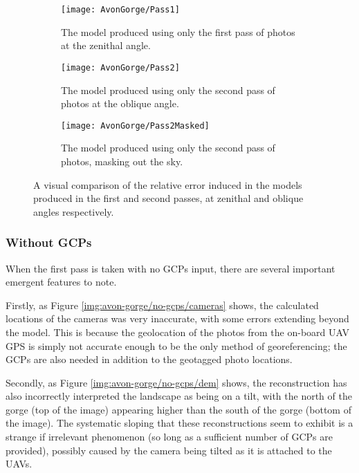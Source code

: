 \begin{figure}
    \centering
    \begin{subfigure}[b]{0.45\textwidth}
        \texttt{[image: AvonGorge/Pass1]}
        \caption{The model produced using only the first pass of photos at the
        zenithal angle.}
        \label{img:avon-gorge/pass-1}
    \end{subfigure}
    \begin{subfigure}[b]{0.45\textwidth}
        \texttt{[image: AvonGorge/Pass2]}
        \caption{The model produced using only the second pass of photos at the
        oblique angle.}
        \label{img:avon-gorge/pass-2}
    \end{subfigure}
    \begin{subfigure}[b]{0.9\textwidth}
        \texttt{[image: AvonGorge/Pass2Masked]}
        \caption{The model produced using only the second pass of photos,
        masking out the sky.}
        \label{img:avon-gorge/pass-2/masked}
    \end{subfigure}
    \caption{A visual comparison of the relative error induced in the models
    produced in the first and second passes, at zenithal and oblique angles
    respectively.}
    \label{img:avon-gorge/passes}
\end{figure}

\subsubsection{Without GCPs}
\label{sec:results/avon-gorge/no-gcps}

When the first pass is taken with no GCPs input, there are several important
emergent features to note.

Firstly, as Figure \ref{img:avon-gorge/no-gcps/cameras} shows, the calculated
locations of the cameras was very inaccurate, with some errors extending beyond
the model. This is because the geolocation of the photos from the on-board UAV
GPS is simply not accurate enough to be the only method of georeferencing; the
GCPs are also needed in addition to the geotagged photo locations.

Secondly, as Figure \ref{img:avon-gorge/no-gcps/dem} shows, the reconstruction
has also incorrectly interpreted the landscape as being on a tilt, with the
north of the gorge (top of the image) appearing higher than the south of the
gorge (bottom of the image). The systematic sloping that these reconstructions
seem to exhibit is a strange if irrelevant phenomenon (so long as a sufficient
number of GCPs are provided), possibly caused by the camera being tilted as it
is attached to the UAVs.

